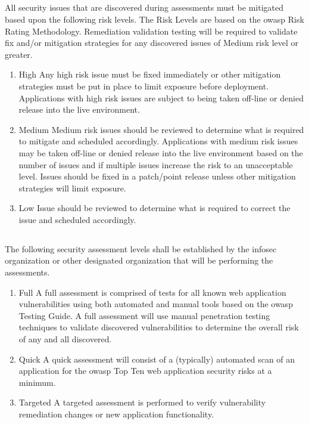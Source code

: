 \subsection*{}
All security issues that are discovered during assessments must be mitigated based upon the following risk levels.  
The Risk Levels are based on the \gls{owasp} Risk Rating Methodology.  
Remediation validation testing will be required to validate fix and/or mitigation strategies for any discovered issues of Medium risk level or greater.  
\begin{enumerate}
\item{High}
Any high risk issue must be fixed immediately or other mitigation strategies must be put in place to limit exposure before deployment.  
Applications with high risk issues are subject to being taken off-line or denied release into the live environment.  
\item{Medium}
Medium risk issues should be reviewed to determine what is required to mitigate and scheduled accordingly.  
Applications with medium risk issues may be taken off-line or denied release into the live environment based on the number of issues and if multiple issues increase the risk to an unacceptable level.  
Issues should be fixed in a patch/point release unless other mitigation strategies will limit exposure.
\item{Low}
Issue should be reviewed to determine what is required to correct the issue and scheduled accordingly.
\end{enumerate}
\subsection*{}
The following security assessment levels shall be established by the \gls{infosec} organization or other designated organization that will be performing the assessments.  
\begin{enumerate}
\item{Full}
A full assessment is comprised of tests for all known web application vulnerabilities using both automated and manual tools based on the \gls{owasp} Testing Guide.  
A full assessment will use manual penetration testing techniques to validate discovered vulnerabilities to determine the overall risk of any and all discovered.
\item{Quick}
A quick assessment will consist of a (typically) automated scan of an application for the \gls{owasp} Top Ten web application security risks at a minimum.
\item{Targeted}
A targeted assessment is performed to verify vulnerability remediation changes or new application functionality.
\end{enumerate}
